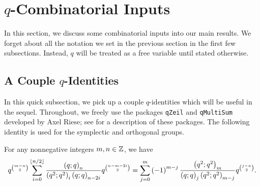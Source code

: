 
\section{\texorpdfstring{$q$}{q}-Combinatorial Inputs} \label{sec:qcombo}
In this section, we discuss some combinatorial inputs into our main results. We forget about all the notation we set in the previous section in the first few subsections. Instead, $q$ will be treated as a free variable until stated otherwise.

\subsection{A Couple \texorpdfstring{$q$}{q}-Identities}
In this quick subsection, we pick up a couple $q$-identities which will be useful in the sequel. Throughout, we freely use the packages \texttt{qZeil} and \texttt{qMultiSum} developed by Axel Riese; see \cite{riese-zeil,riese-multisum} for a description of these packages. The following identity is used for the symplectic and orthogonal groups.
\begin{prop}
    For any nonnegative integers $m,n\in\mathbb Z$, we have
    \[q^{\binom{m-n}2}\sum_{i=0}^{\left\lfloor{n/2}\right\rfloor}\frac{\left(q;q\right)_n}{\left(q^{2};q^{2}\right)_i\left(q;q\right)_{n-2i}}q^{\binom{n-m-2i}2}=\sum_{j=0}^{m}\left(-1\right)^{m-j}\frac{\left(q^{2};q^{2}\right)_m}{\left(q;q\right)_j\left(q^{2};q^{2}\right)_{m-j}}q^{\binom{j-n}2}.\]
\end{prop}
